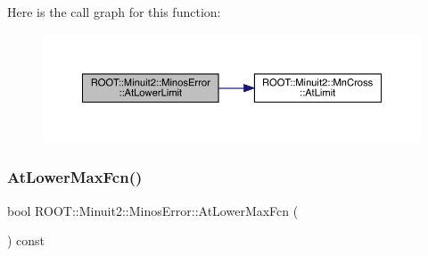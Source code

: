Here is the call graph for this function\+:
\nopagebreak
\begin{figure}[H]
\begin{center}
\leavevmode
\includegraphics[width=350pt]{d2/dd1/classROOT_1_1Minuit2_1_1MinosError_ab5bac1c70b34e42714730cad95978b51_cgraph}
\end{center}
\end{figure}
\mbox{\label{classROOT_1_1Minuit2_1_1MinosError_a6ec22eac3b7dd1a281f1df710ed1dc74}} 
\subsubsection{\texorpdfstring{AtLowerMaxFcn()}{AtLowerMaxFcn()}\hspace{0.1cm}{\footnotesize\ttfamily [1/2]}}
{\footnotesize\ttfamily bool R\+O\+O\+T\+::\+Minuit2\+::\+Minos\+Error\+::\+At\+Lower\+Max\+Fcn (\begin{DoxyParamCaption}{ }\end{DoxyParamCaption}) const\hspace{0.3cm}{\ttfamily [inline]}}

